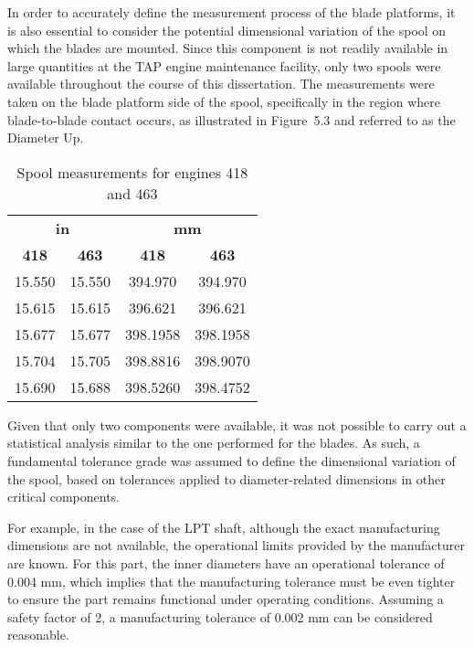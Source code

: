 In order to accurately define the measurement process of the blade platforms, it is also essential to consider the potential dimensional variation of the spool on which the blades are mounted. 
Since this component is not readily available in large quantities at the TAP engine maintenance facility, only two spools were available throughout the course of this dissertation. 
The measurements were taken on the blade platform side of the spool, specifically in the region where blade-to-blade contact occurs, as illustrated in Figure~5.3 and referred to as the Diameter Up.

\begin{table}[H]
    \centering
    \caption{Spool measurements for engines 418 and 463}
    \label{tab:spool_measurements}
    \begin{tabular}{cc|cc}
        \hline
        \multicolumn{2}{c|}{\textbf{in}} & \multicolumn{2}{c}{\textbf{mm}} \\
        \textbf{418} & \textbf{463} & \textbf{418} & \textbf{463} \\
        \hline
        15.550 & 15.550 & 394.970  & 394.970  \\
        15.615 & 15.615 & 396.621  & 396.621  \\
        15.677 & 15.677 & 398.1958 & 398.1958 \\
        15.704 & 15.705 & 398.8816 & 398.9070 \\
        15.690 & 15.688 & 398.5260 & 398.4752 \\
        \hline
    \end{tabular}
\end{table}

Given that only two components were available, it was not possible to carry out a statistical analysis similar to the one performed for the blades. As such, a fundamental tolerance grade was assumed to define the dimensional variation of the spool, based on tolerances applied to diameter-related dimensions in other critical components.

For example, in the case of the \gls{LPT} shaft, although the exact manufacturing dimensions are not available, the operational limits provided by the manufacturer are known. For this part, the inner diameters have an operational tolerance of 0.004 mm, which implies that the manufacturing tolerance must be even tighter to ensure the part remains functional under operating conditions. Assuming a safety factor of 2, a manufacturing tolerance of 0.002 mm can be considered reasonable.


